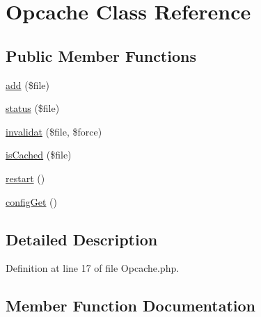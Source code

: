 \hypertarget{class_zest_1_1_cache_1_1_opcache_1_1_opcache}{}\section{Opcache Class Reference}
\label{class_zest_1_1_cache_1_1_opcache_1_1_opcache}
\subsection*{Public Member Functions}
\begin{DoxyCompactItemize}
\item 
\mbox{\hyperlink{class_zest_1_1_cache_1_1_opcache_1_1_opcache_a120db2bef1cec63be86028285c2f6cd4}{add}} (\$file)
\item 
\mbox{\hyperlink{class_zest_1_1_cache_1_1_opcache_1_1_opcache_a67c038776f18f8436abb3933f2b2611f}{status}} (\$file)
\item 
\mbox{\hyperlink{class_zest_1_1_cache_1_1_opcache_1_1_opcache_a54488782e0aac9baf864c137182108e0}{invalidat}} (\$file, \$force)
\item 
\mbox{\hyperlink{class_zest_1_1_cache_1_1_opcache_1_1_opcache_a02c7b2a1dc98a6a9b46af81f968a0c8c}{is\+Cached}} (\$file)
\item 
\mbox{\hyperlink{class_zest_1_1_cache_1_1_opcache_1_1_opcache_ac8de9e38ce27c87f710dff42a13455cf}{restart}} ()
\item 
\mbox{\hyperlink{class_zest_1_1_cache_1_1_opcache_1_1_opcache_a9d1798b16db43d2ef1a36b9d3ce27731}{config\+Get}} ()
\end{DoxyCompactItemize}


\subsection{Detailed Description}


Definition at line 17 of file Opcache.\+php.



\subsection{Member Function Documentation}
\mbox{\label{class_zest_1_1_cache_1_1_opcache_1_1_opcache_a120db2bef1cec63be86028285c2f6cd4}} 
